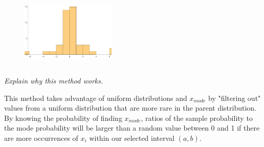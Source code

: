 \documentclass{article}
\begin{document}
\begin{figure}[H]
    \centering
    \includegraphics[width=0.4\textwidth]{figures/histogram.pdf}
    \label{fig:my_label}
\end{figure}
\subsection{}
\textit{Explain why this method works.}

This method takes advantage of uniform distributions and $x_{mode}$ by "filtering out" values from a uniform distribution that are more rare in the parent distribution. By knowing the probability of finding $x_{mode}$, ratios of the sample probability to the mode probability will be larger than a random value between 0 and 1 if there are more occurrences of $x_i$ within our selected interval $(a,b)$. 
\end{document}
